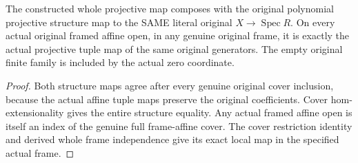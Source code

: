 \begin{theorem}
\label{thm:fc-generated-line-whole-projective-map-original-structure}
\leanok
{}
The constructed whole projective map composes with the original
polynomial projective structure map to the SAME literal original
$X\to\operatorname{Spec}R$. On every actual original framed affine
open, in any genuine original frame, it is exactly the actual
projective tuple map of the same original generators. The empty
original finite family is included by the actual zero coordinate.
\end{theorem}
\begin{proof}
Both structure maps agree after every genuine original cover
inclusion, because the actual affine tuple maps preserve the
original coefficients. Cover hom-extensionality gives the entire
structure equality. Any actual framed affine open is itself an
index of the genuine full frame-affine cover. The cover restriction
identity and derived whole frame independence give its exact local
map in the specified actual frame.
\end{proof}
